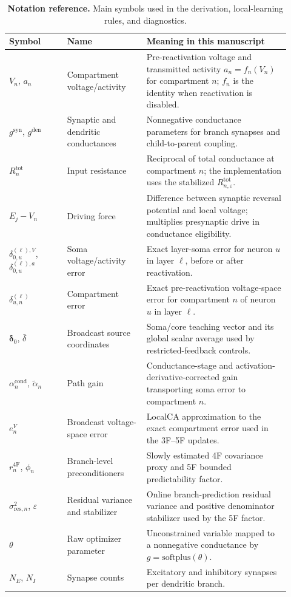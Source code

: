     \begin{table}[htbp]
    \centering
    \scriptsize
    \setlength{\tabcolsep}{3pt}
    \renewcommand{\arraystretch}{1.06}
    \begin{tabular}{@{}L{0.19\linewidth}L{0.26\linewidth}L{0.47\linewidth}@{}}
    \toprule
    \textbf{Symbol} & \textbf{Name} & \textbf{Meaning in this manuscript} \\
    \midrule
    $V_n$, $a_n$ & Compartment voltage/activity & Pre-reactivation voltage and transmitted activity $a_n=f_n(V_n)$ for compartment $n$; $f_n$ is the identity when reactivation is disabled. \\
    $g^{\mathrm{syn}}$, $g^{\mathrm{den}}$ & Synaptic and dendritic conductances & Nonnegative conductance parameters for branch synapses and child-to-parent coupling. \\
    $R_n^{\mathrm{tot}}$ & Input resistance & Reciprocal of total conductance at compartment $n$; the implementation uses the stabilized $R_{n,\varepsilon}^{\mathrm{tot}}$. \\
    $E_j-V_n$ & Driving force & Difference between synaptic reversal potential and local voltage; multiplies presynaptic drive in conductance eligibility. \\
    $\delta_{0,u}^{(\ell),V}$, $\delta_{0,u}^{(\ell),a}$ & Soma voltage/activity error & Exact layer-soma error for neuron $u$ in layer $\ell$, before or after reactivation. \\
    $\delta_{u,n}^{(\ell)}$ & Compartment error & Exact pre-reactivation voltage-space error for compartment $n$ of neuron $u$ in layer $\ell$. \\
    $\boldsymbol{\delta}_0$, $\bar{\delta}$ & Broadcast source coordinates & Soma/core teaching vector and its global scalar average used by restricted-feedback controls. \\
    $\alpha_n^{\mathrm{cond}}$, $\tilde{\alpha}_n$ & Path gain & Conductance-stage and activation-derivative-corrected gain transporting soma error to compartment $n$. \\
    $e_n^V$ & Broadcast voltage-space error & LocalCA approximation to the exact compartment error used in the 3F--5F updates. \\
    $r_n^{\mathrm{4F}}$, $\phi_n$ & Branch-level preconditioners & Slowly estimated 4F covariance proxy and 5F bounded predictability factor. \\
    $\sigma_{\mathrm{res},n}^2$, $\varepsilon$ & Residual variance and stabilizer & Online branch-prediction residual variance and positive denominator stabilizer used by the 5F factor. \\
    $\theta$ & Raw optimizer parameter & Unconstrained variable mapped to a nonnegative conductance by $g=\mathrm{softplus}(\theta)$. \\
    $N_E$, $N_I$ & Synapse counts & Excitatory and inhibitory synapses per dendritic branch. \\
    \bottomrule
    \end{tabular}
    \caption{\textbf{Notation reference.} Main symbols used in the derivation, local-learning rules, and diagnostics.}
    \label{tab:notation_reference}
    \end{table}
    
